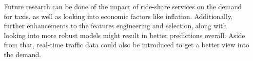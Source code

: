 \documentclass[11pt]{article}
\begin{document}
Future research can be done of the impact of ride-share services on the demand for taxis, as well as looking into economic factors like inflation. Additionally, further enhancements to the features engineering and selection, along with looking into more robust models might result in better predictions overall. Aside from that, real-time traffic data could also be introduced to get a better view into the demand. 

\clearpage

\printbibliography
\end{document}
